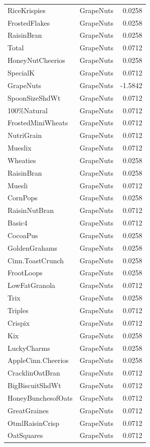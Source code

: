 \begin{longtable}{llr}
RiceKrispies & GrapeNuts & 0.0258 \\
FrostedFlakes & GrapeNuts & 0.0258 \\
RaisinBran & GrapeNuts & 0.0258 \\
Total & GrapeNuts & 0.0712 \\
HoneyNutCheerios & GrapeNuts & 0.0258 \\
SpecialK & GrapeNuts & 0.0712 \\
GrapeNuts & GrapeNuts & -1.5842 \\
SpoonSizeShdWt & GrapeNuts & 0.0712 \\
100\%Natural & GrapeNuts & 0.0712 \\
FrostedMiniWheats & GrapeNuts & 0.0712 \\
NutriGrain & GrapeNuts & 0.0712 \\
Mueslix & GrapeNuts & 0.0712 \\
Wheaties & GrapeNuts & 0.0258 \\
RaisinBran & GrapeNuts & 0.0258 \\
Muesli & GrapeNuts & 0.0712 \\
CornPops & GrapeNuts & 0.0258 \\
RaisinNutBran & GrapeNuts & 0.0712 \\
Basic4 & GrapeNuts & 0.0712 \\
CocoaPus & GrapeNuts & 0.0258 \\
GoldenGrahams & GrapeNuts & 0.0258 \\
Cinn.ToastCrunch & GrapeNuts & 0.0258 \\
FrootLoops & GrapeNuts & 0.0258 \\
LowFatGranola & GrapeNuts & 0.0712 \\
Trix & GrapeNuts & 0.0258 \\
Triples & GrapeNuts & 0.0712 \\
Crispix & GrapeNuts & 0.0712 \\
Kix & GrapeNuts & 0.0258 \\
LuckyCharms & GrapeNuts & 0.0258 \\
AppleCinn.Cheerios & GrapeNuts & 0.0258 \\
CracklinOatBran & GrapeNuts & 0.0712 \\
BigBiscuitShdWt & GrapeNuts & 0.0712 \\
HoneyBunchesofOats & GrapeNuts & 0.0712 \\
GreatGraines & GrapeNuts & 0.0712 \\
OtmlRaisinCrisp & GrapeNuts & 0.0712 \\
OatSquares & GrapeNuts & 0.0712 \\

\end{longtable}

